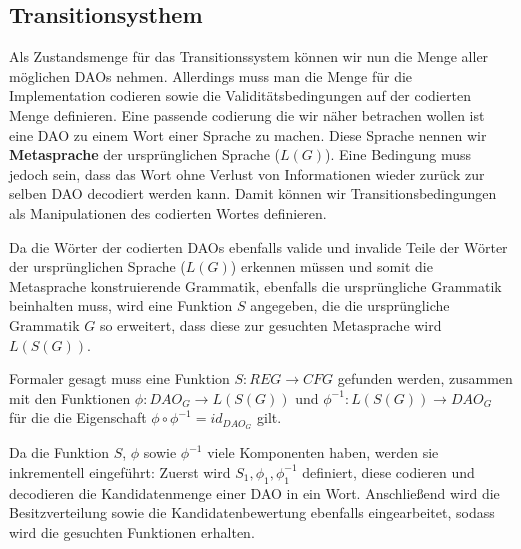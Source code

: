 \documentclass[a4paper,12pt]{article}
\begin{document}
% 

% 




\subsection*{Transitionsysthem}
Als Zustandsmenge für das Transitionssystem können wir nun die Menge aller möglichen DAOs nehmen. Allerdings muss man die Menge für die Implementation codieren sowie die Validitätsbedingungen auf der codierten Menge definieren. Eine passende codierung die wir näher betrachen wollen ist eine DAO zu einem Wort einer Sprache zu machen. Diese Sprache nennen wir \textbf{Metasprache} der ursprünglichen Sprache ($L(G)$). Eine Bedingung muss jedoch sein, dass das Wort ohne Verlust von Informationen wieder zurück zur selben DAO decodiert werden kann. Damit können wir Transitionsbedingungen als Manipulationen des codierten Wortes definieren. 

Da die Wörter der codierten DAOs ebenfalls valide und invalide Teile der Wörter der ursprünglichen Sprache ($L(G)$) erkennen müssen und somit die Metasprache konstruierende Grammatik, ebenfalls die ursprüngliche Grammatik beinhalten muss, wird eine Funktion $S$ angegeben, die die ursprüngliche Grammatik $G$ so erweitert, dass diese zur gesuchten Metasprache wird $L(S(G))$.

Formaler gesagt muss eine Funktion $S: REG\rightarrow CFG$ gefunden werden, zusammen mit den Funktionen $\phi: DAO_G \rightarrow L(S(G))$ und $\phi^{-1}: L(S(G)) \rightarrow DAO_G$ für die die Eigenschaft $\phi\circ\phi^{-1} = id_{DAO_G}$ gilt.

Da die Funktion $S$, $\phi$ sowie $\phi^{-1}$ viele Komponenten haben, werden sie inkrementell eingeführt: Zuerst wird $S_1, \phi_1, \phi^{-1}_1$ definiert, diese codieren und decodieren die Kandidatenmenge einer DAO in ein Wort. Anschließend wird die Besitzverteilung sowie die Kandidatenbewertung ebenfalls eingearbeitet, sodass wird die gesuchten Funktionen erhalten.
\end{document}
